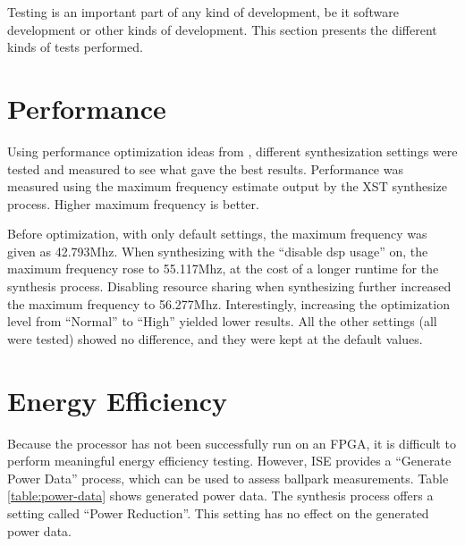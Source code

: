 Testing is an important part of any kind of development, be it software development or other kinds of development.
This section presents the different kinds of tests performed.

\section{Performance} \label{sec:results-performance}

Using performance optimization ideas from \cite{xilinx-speed-strategies}, different synthesization settings were tested and measured to see what gave the best results.
Performance was measured using the maximum frequency estimate output by the XST synthesize process.
Higher maximum frequency is better.

Before optimization, with only default settings, the maximum frequency was given as 42.793Mhz.
When synthesizing with the ``disable dsp usage'' on, the maximum frequency rose to 55.117Mhz, at the cost of a longer runtime for the synthesis process.
Disabling resource sharing when synthesizing further increased the maximum frequency to 56.277Mhz.
Interestingly, increasing the optimization level from ``Normal'' to ``High'' yielded lower results.
All the other settings (all were tested) showed no difference, and they were kept at the default values.

\section{Energy Efficiency}

Because the processor has not been successfully run on an FPGA, it is difficult to perform meaningful energy efficiency testing.
However, ISE provides a ``Generate Power Data'' process, which can be used to assess ballpark measurements.
Table \vref{table:power-data} shows generated power data.
The synthesis process offers a setting called ``Power Reduction''.
This setting has no effect on the generated power data.

